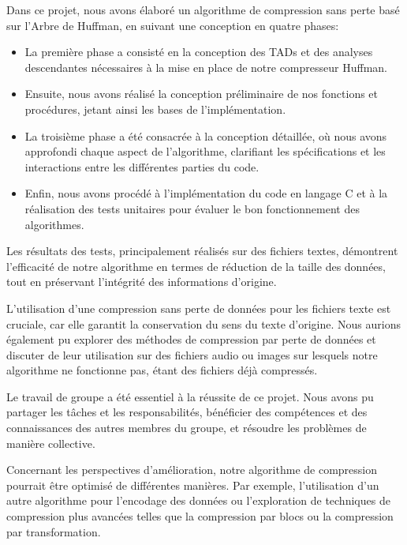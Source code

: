 
Dans ce projet, nous avons élaboré un algorithme de compression sans perte basé sur l'Arbre de Huffman, en suivant une conception en quatre phases:

\begin{itemize}
    \item La première phase a consisté en la conception des TADs et des analyses descendantes nécessaires à la mise en place de notre compresseur Huffman.

    \item Ensuite, nous avons réalisé la conception préliminaire de nos fonctions et procédures, jetant ainsi les bases de l'implémentation.

    \item La troisième phase a été consacrée à la conception détaillée, où nous avons approfondi chaque aspect de l'algorithme, clarifiant les spécifications et les interactions entre les différentes parties du code.

    \item Enfin, nous avons procédé à l'implémentation du code en langage C et à la réalisation des tests unitaires pour évaluer le bon fonctionnement des algorithmes.
\end{itemize}

Les résultats des tests, principalement réalisés sur des fichiers textes, démontrent l'efficacité de notre algorithme en termes de réduction de la taille des données, tout en préservant l'intégrité des informations d'origine.

L'utilisation d'une compression sans perte de données pour les fichiers texte est cruciale, car elle garantit la conservation du sens du texte d'origine. Nous aurions également pu explorer des méthodes de compression par perte de données et discuter de leur utilisation sur des fichiers audio ou images sur lesquels notre algorithme ne fonctionne pas, étant des fichiers déjà compressés.

Le travail de groupe a été essentiel à la réussite de ce projet. Nous avons pu partager les tâches et les responsabilités, bénéficier des compétences et des connaissances des autres membres du groupe, et résoudre les problèmes de manière collective.

Concernant les perspectives d'amélioration, notre algorithme de compression pourrait être optimisé de différentes manières. Par exemple, l'utilisation d'un autre algorithme pour l'encodage des données ou l'exploration de techniques de compression plus avancées telles que la compression par blocs ou la compression par transformation.


